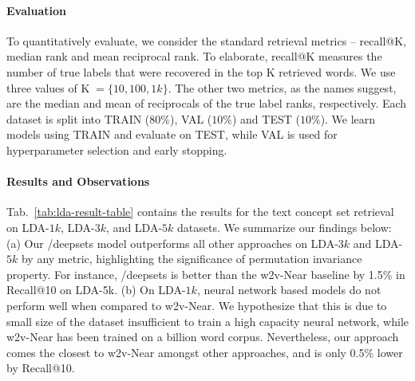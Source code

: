 \documentclass{article}
\newcommand{\compactparagraph}[1]{\vspace*{-10pt}\paragraph{#1}}
\newcommand{\reftab}[1]{Tab.~\ref{#1}}
\begin{document}
\compactparagraph{Evaluation}
To quantitatively evaluate, we consider the standard retrieval metrics -- recall@K, median rank and mean reciprocal rank. To elaborate, recall@K measures the number of true labels that were recovered in the top K retrieved words. We use three values of K$\;=\{10, 100, 1k\}$. The other two metrics, as the names suggest, are the median and mean of reciprocals of the true label ranks, respectively. Each dataset is split into TRAIN ($80\%$), VAL ($10\%$) and TEST ($10\%$). We learn models using TRAIN and evaluate on TEST, while VAL is used for hyperparameter selection and early stopping.

\compactparagraph{Results and Observations}
\reftab{tab:lda-result-table} contains the results for the text concept set retrieval on LDA-$1k$, LDA-$3k$, and LDA-$5k$ datasets. We summarize our findings below: (a) Our /deepsets model outperforms all other approaches on LDA-$3k$ and LDA-$5k$ by any metric, highlighting the significance of permutation invariance property. For instance, /deepsets is better than the w2v-Near baseline by 1.5\% in Recall@10 on LDA-5k. (b) On LDA-$1k$, neural network based models do not perform well when compared to w2v-Near. We hypothesize that this is due to small size of the dataset insufficient to train a high capacity neural network, while w2v-Near has been trained on a billion word corpus. Nevertheless, our approach comes the closest to w2v-Near amongst other approaches, and is only 0.5\% lower by Recall@10. 
\end{document}
